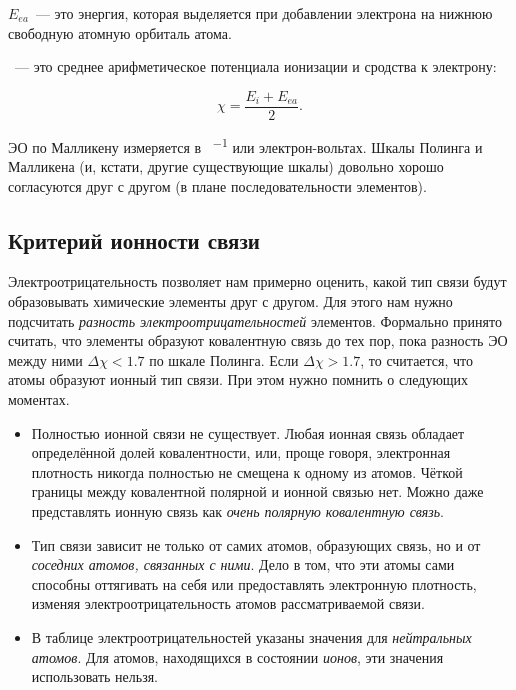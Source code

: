  $E_{ea}$~--- это энергия, которая выделяется при добавлении электрона на нижнюю свободную атомную орбиталь атома.

~--- это среднее арифметическое потенциала ионизации и сродства к электрону:

\begin{equation*}
    \chi = \frac{E_i + E_{ea}}{2}.
\end{equation*}

ЭО по Малликену измеряется в \unit{\ruKJ\per\ruMole} или электрон-вольтах. Шкалы Полинга и Малликена (и, кстати, другие существующие шкалы) довольно хорошо согласуются друг с другом (в плане последовательности элементов).

\subsection*{Критерий ионности связи}

Электроотрицательность позволяет нам примерно оценить, какой тип связи будут образовывать химические элементы друг с другом. Для этого нам нужно подсчитать \emph{разность электроотрицательностей} элементов. Формально принято считать, что элементы образуют ковалентную связь до тех пор, пока разность ЭО между ними $\Delta \chi < \num{1,7}$ по шкале Полинга. Если $\Delta \chi > \num{1,7}$, то считается, что атомы образуют ионный тип связи. При этом нужно помнить о следующих моментах.

\begin{itemize}
    \item Полностью ионной связи не существует. Любая ионная связь обладает определённой долей ковалентности, или, проще говоря, электронная плотность никогда полностью не смещена к одному из атомов. Чёткой границы между ковалентной полярной и ионной связью нет. Можно даже представлять ионную связь как \emph{очень полярную ковалентную связь}.
    \item Тип связи зависит не только от самих атомов, образующих связь, но и от \emph{соседних атомов, связанных с ними}. Дело в том, что эти атомы сами способны оттягивать на себя или предоставлять электронную плотность, изменяя электроотрицательность атомов рассматриваемой связи.
    \item В таблице электроотрицательностей указаны значения для \emph{нейтральных атомов}. Для атомов, находящихся в состоянии \emph{ионов}, эти значения использовать нельзя.
\end{itemize}

